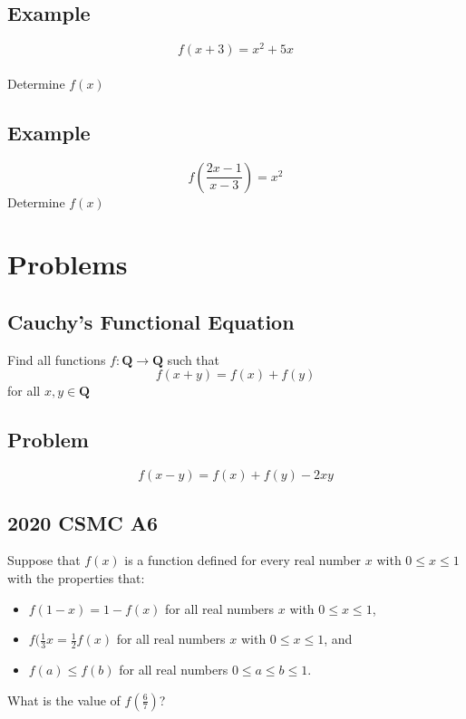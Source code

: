 \documentclass{article}
\begin{document}
\subsection{Example}
$$
f(x+3)=x^2+5x
$$
\\Determine $f(x)$
\vspace{240px}

\subsection{Example}
$$
f(\frac{2x-1}{x-3})=x^2
$$
Determine $f(x)$
\pagebreak

\section{Problems}
\subsection{Cauchy's Functional Equation}
Find all functions $f:\mathbf{Q}\rightarrow\mathbf{Q}$ such that
$$
f(x+y)=f(x)+f(y)
$$
for all $x, y \in \mathbf{Q}$
\vspace{220px}

\subsection{Problem}
$$
f(x-y)=f(x)+f(y)-2xy
$$
\pagebreak

\subsection{2020 CSMC A6}
Suppose that $f(x)$ is a function defined for every real number $x$ with $0 \le x \le 1$ with the properties that:
\begin{itemize}
    \item $f(1-x)=1-f(x)$ for all real numbers $x$ with $0 \le x \le 1$,
    \item $f(\frac{1}{3}x=\frac{1}{2}f(x)$ for all real numbers $x$ with $0 \le x \le 1$, and
    \item $f(a) \le f(b)$ for all real numbers $0 \le a \le b \le 1$.
\end{itemize}
What is the value of $f(\frac{6}{7})$?
\pagebreak
\end{document}
